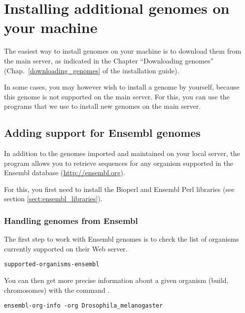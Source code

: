 

\chapter{Installing additional genomes on your machine}
\label{chap:install_genomes}

The easiest way to install genomes on your machine is to download them
from the main \RSAT server, as indicated in the Chapter ``Downloading
genomes'' (Chap.~\ref{downloading_genomes} of the installation guide).

In some cases, you may however wish to install a genome by yourself,
because this genome is not supported on the main \RSAT server. For
this, you can use the programs that we use to install new genomes on
the main \RSAT server.

\section{Adding support for Ensembl genomes}

In addition to the genomes imported and maintained on your local \RSAT
server, the program  allows you to
retrieve sequences for any organism supported in the Ensembl database
(\url{http://ensembl.org}).

For this, you first need to install the Bioperl and Ensembl Perl
libraries (see section \ref{sect:ensembl_libraries}).

\subsection{Handling genomes from Ensembl}

The first step to work with Ensembl genomes is to check the list of
organisms currently supported on their Web server.

\begin{lstlisting}
supported-organisms-ensembl
\end{lstlisting}

You can then get more precise information about a given organism
(build, chromosomes) with the command .

\begin{lstlisting}
ensembl-org-info -org Drosophila_melanogaster
\end{lstlisting}

